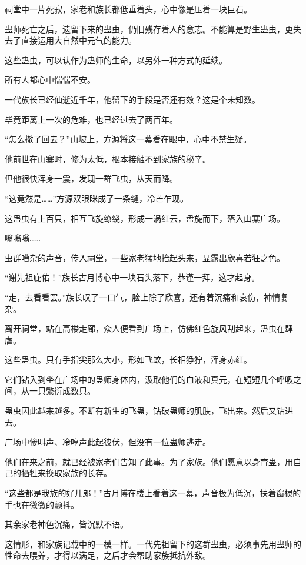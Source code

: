 
\begin{this_body}

祠堂中一片死寂，家老和族长都低垂着头，心中像是压着一块巨石。

蛊师死亡之后，遗留下来的蛊虫，仍旧残存着人的意志。不能算是野生蛊虫，更失去了直接运用大自然中元气的能力。

这些蛊虫，可以认作为蛊师的生命，以另外一种方式的延续。

所有人都心中惴惴不安。

一代族长已经仙逝近千年，他留下的手段是否还有效？这是个未知数。

毕竟距离上一次的危难，也已经过去了两百年。

“怎么撤了回去？”山坡上，方源将这一幕看在眼中，心中不禁生疑。

他前世在山寨时，修为太低，根本接触不到家族的秘辛。

但他很快浑身一震，发现一群飞虫，从天而降。

“这竟然是……”方源双眼眯成了一条缝，冷芒乍现。

这蛊虫有上百只，相互飞旋缭绕，形成一涡红云，盘旋而下，落入山寨广场。

嗡嗡嗡……

虫群嘈杂的声音，传入祠堂，一些家老猛地抬起头来，显露出欣喜若狂之色。

“谢先祖庇佑！”族长古月博心中一块石头落下，恭谨一拜，这才起身。

“走，去看看罢。”族长叹了一口气，脸上除了欣喜，还有着沉痛和哀伤，神情复杂。

离开祠堂，站在高楼走廊，众人便看到广场上，仿佛红色旋风刮起来，蛊虫在肆虐。

这些蛊虫。只有手指尖那么大小，形如飞蚊，长相狰狞，浑身赤红。

它们钻入到坐在广场中的蛊师身体内，汲取他们的血液和真元，在短短几个呼吸之间，从一只繁衍成数只。

蛊虫因此越来越多。不断有新生的飞蛊，钻破蛊师的肌肤，飞出来。然后又钻进去。

广场中惨叫声、冷哼声此起彼伏，但没有一位蛊师逃走。

他们在来之前，就已经被家老们告知了此事。为了家族。他们愿意以身育蛊，用自己的牺牲来换取家族的长存。

“这些都是我族的好儿郎！”古月博在楼上看着这一幕，声音极为低沉，扶着窗棂的手也在微微的颤抖。

其余家老神色沉痛，皆沉默不语。

这情形，和家族记载中的一模一样。一代先祖留下的这群蛊虫，必须事先用蛊师的性命去喂养，才得以满足，之后才会帮助家族抵抗外敌。


\end{this_body}
